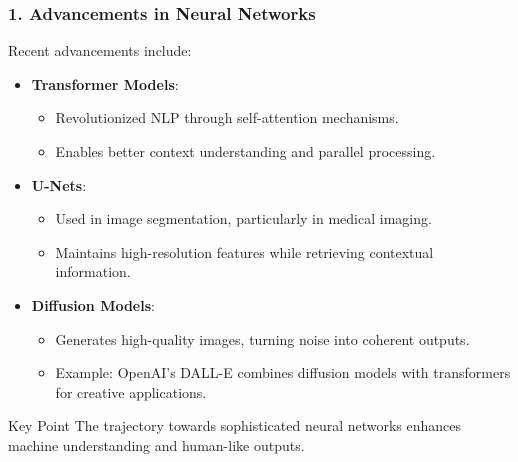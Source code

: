 \documentclass[aspectratio=169]{beamer}
\begin{document}
\begin{frame}[fragile]
    \frametitle{1. Advancements in Neural Networks}
    Recent advancements include:
    \begin{itemize}
        \item \textbf{Transformer Models}:
        \begin{itemize}
            \item Revolutionized NLP through self-attention mechanisms.
            \item Enables better context understanding and parallel processing.
        \end{itemize}
        
        \item \textbf{U-Nets}:
        \begin{itemize}
            \item Used in image segmentation, particularly in medical imaging.
            \item Maintains high-resolution features while retrieving contextual information.
        \end{itemize}
        
        \item \textbf{Diffusion Models}:
        \begin{itemize}
            \item Generates high-quality images, turning noise into coherent outputs.
            \item Example: OpenAI’s DALL-E combines diffusion models with transformers for creative applications.
        \end{itemize}
    \end{itemize}
    \begin{block}{Key Point}
        The trajectory towards sophisticated neural networks enhances machine understanding and human-like outputs.
    \end{block}
\end{frame}
\end{document}
